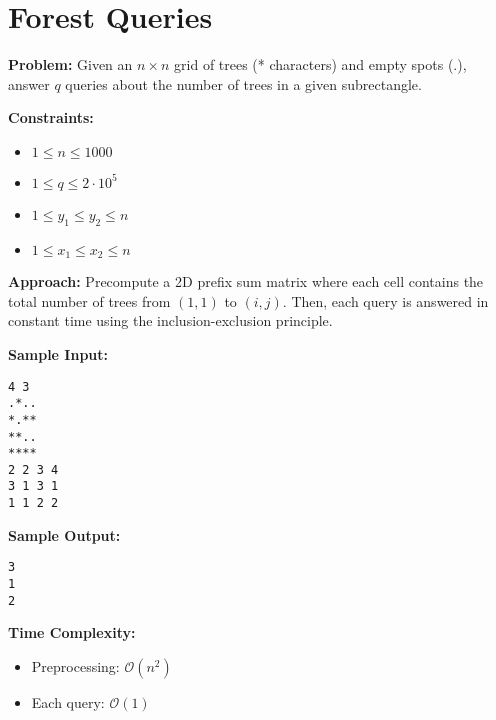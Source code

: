 \section{Forest Queries}

\textbf{Problem:} Given an $n \times n$ grid of trees (* characters) and empty spots (.), answer $q$ queries about the number of trees in a given subrectangle.

\textbf{Constraints:}
\begin{itemize}
    \item $1 \leq n \leq 1000$
    \item $1 \leq q \leq 2 \cdot 10^5$
    \item $1 \leq y_1 \leq y_2 \leq n$
    \item $1 \leq x_1 \leq x_2 \leq n$
\end{itemize}

\textbf{Approach:} Precompute a 2D prefix sum matrix where each cell contains the total number of trees from $(1,1)$ to $(i,j)$. Then, each query is answered in constant time using the inclusion-exclusion principle.

\textbf{Sample Input:}
\begin{verbatim}
4 3
.*..
*.**
**..
****
2 2 3 4
3 1 3 1
1 1 2 2
\end{verbatim}

\textbf{Sample Output:}
\begin{verbatim}
3
1
2
\end{verbatim}

\textbf{Time Complexity:}
\begin{itemize}
    \item Preprocessing: $\mathcal{O}(n^2)$
    \item Each query: $\mathcal{O}(1)$
\end{itemize}

